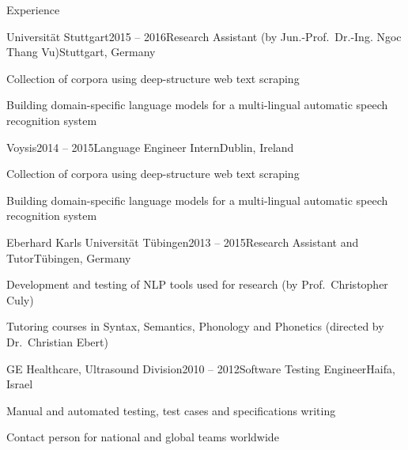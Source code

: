 \documentclass{resume} %
\begin{document}
\begin{rSection}{Experience}

\begin{rSubsection}{Universität Stuttgart}{2015 -- 2016}{Research Assistant (by Jun.-Prof.\ Dr.-Ing. Ngoc Thang Vu)}{Stuttgart, Germany}
	\setlength{\itemindent}{.7cm}
	
	\item Collection of corpora using deep-structure web text scraping
	
	\item Building domain-specific language models for a multi-lingual automatic speech recognition system 
\end{rSubsection}

\begin{rSubsection}{Voysis}{2014 -- 2015}{Language Engineer Intern}{Dublin, Ireland}
	\setlength{\itemindent}{.7cm}
	
	\item Collection of corpora using deep-structure web text scraping
	
	\item Building domain-specific language models for a multi-lingual automatic speech recognition system 
\end{rSubsection}

\begin{rSubsection}{Eberhard Karls Universität Tübingen}{2013 -- 2015}{Research Assistant and Tutor}{Tübingen, Germany}
	\setlength{\itemindent}{.7cm}
	
	\item Development and testing of NLP tools used for research (by Prof.\ Christopher Culy)
	
	\item Tutoring courses in Syntax, Semantics, Phonology and Phonetics (directed by Dr.\ Christian Ebert)
\end{rSubsection}

\begin{rSubsection}{GE Healthcare, Ultrasound Division}{2010 -- 2012}{Software Testing Engineer}{Haifa, Israel}
	\setlength{\itemindent}{.7cm}
	
	\item Manual and automated testing, test cases and specifications writing
	
	\item Contact person for national and global teams worldwide 
\end{rSubsection}


\end{rSection}
\end{document}
